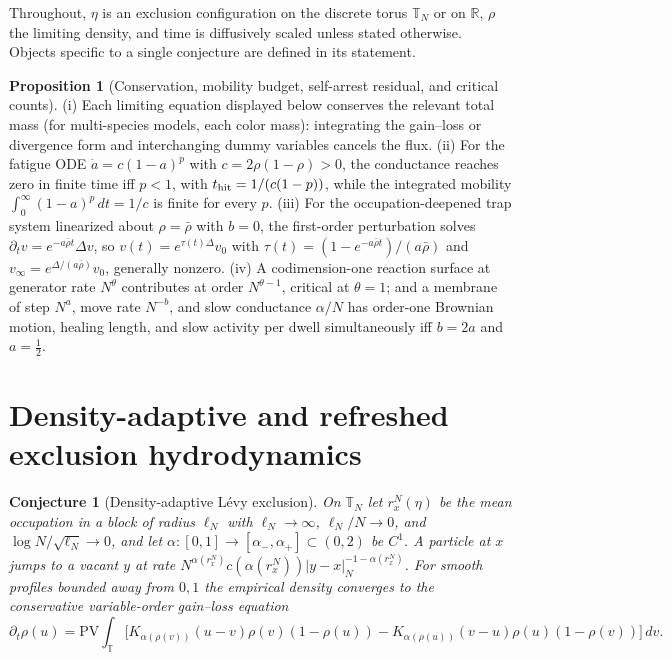 \documentclass[11pt]{article}
\newtheorem{conjecture}{Conjecture}
\theoremstyle{definition}
\newtheorem{proposition}{Proposition}
\begin{document}
Throughout, $\eta$ is an exclusion configuration on the discrete torus $\mathbb T_N$ or on $\mathbb R$, $\rho$ the limiting density, and time is diffusively scaled unless stated otherwise.  Objects specific to a single conjecture are defined in its statement.

\begin{proposition}[Conservation, mobility budget, self-arrest residual, and critical counts]\label{an:reductions}
{\rm(i)} Each limiting equation displayed below conserves the relevant total mass (for multi-species models, each color mass): integrating the gain--loss or divergence form and interchanging dummy variables cancels the flux.  {\rm(ii)} For the fatigue ODE $\dot a=c(1-a)^p$ with $c=2\rho(1-\rho)>0$, the conductance reaches zero in finite time iff $p<1$, with $t_{\rm hit}=1/(c(1-p))$, while the integrated mobility $\int_0^\infty(1-a)^p\,dt=1/c$ is finite for every $p$.  {\rm(iii)} For the occupation-deepened trap system linearized about $\rho=\bar\rho$ with $b=0$, the first-order perturbation solves $\partial_tv=e^{-a\bar\rho t}\Delta v$, so $v(t)=e^{\tau(t)\Delta}v_0$ with $\tau(t)=(1-e^{-a\bar\rho t})/(a\bar\rho)$ and $v_\infty=e^{\Delta/(a\bar\rho)}v_0$, generally nonzero.  {\rm(iv)} A codimension-one reaction surface at generator rate $N^\theta$ contributes at order $N^{\theta-1}$, critical at $\theta=1$; and a membrane of step $N^a$, move rate $N^{-b}$, and slow conductance $\alpha/N$ has order-one Brownian motion, healing length, and slow activity per dwell simultaneously iff $b=2a$ and $a=\tfrac12$.
\end{proposition}

\section{Density-adaptive and refreshed exclusion hydrodynamics}

\begin{conjecture}[Density-adaptive L\'evy exclusion]\label{an1}
On $\mathbb T_N$ let $r_x^N(\eta)$ be the mean occupation in a block of radius $\ell_N$ with $\ell_N\to\infty$, $\ell_N/N\to0$, and $\log N/\sqrt{\ell_N}\to0$, and let $\alpha:[0,1]\to[\alpha_-,\alpha_+]\subset(0,2)$ be $C^1$.  A particle at $x$ jumps to a vacant $y$ at rate $N^{\alpha(r_x^N)}c(\alpha(r_x^N))|y-x|_N^{-1-\alpha(r_x^N)}$.  For smooth profiles bounded away from $0,1$ the empirical density converges to the conservative variable-order gain--loss equation
\[
\partial_t\rho(u)=\mathrm{PV}\!\int_{\mathbb T}\bigl[K_{\alpha(\rho(v))}(u-v)\rho(v)(1-\rho(u))-K_{\alpha(\rho(u))}(v-u)\rho(u)(1-\rho(v))\bigr]\,dv.
\]
\end{conjecture}
\end{document}
